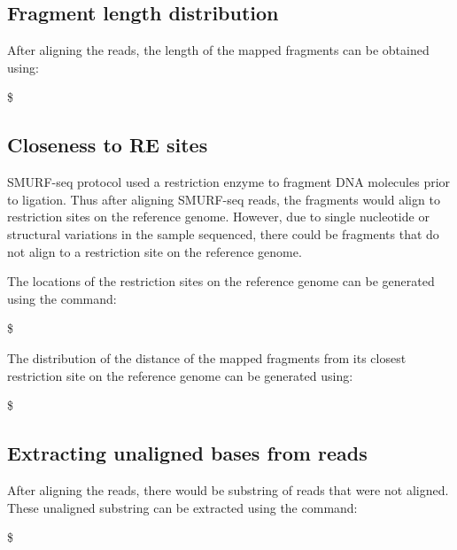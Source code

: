 \documentclass[11pt]{article}
\newenvironment{cmd}
{\list{}{
    \parsep=0em
    \itemindent=17pt
    \listparindent=50pt
    \leftmargin=0in
    \rightmargin=0in
  }\item[] \ttfamily \$}
{\endlist}
\begin{document}
\subsection{Fragment length distribution}
After aligning the reads, the length of the mapped fragments can be obtained
using: 
\begin{cmd}

\end{cmd}

\subsection{Closeness to RE sites}
SMURF-seq protocol used a restriction enzyme to fragment DNA molecules prior 
to ligation. Thus after aligning SMURF-seq reads, the fragments would
align to restriction sites on the reference genome. However, due to single
nucleotide or structural variations in the sample sequenced, there could
be fragments that do not align to a restriction site on the reference
genome. 

The locations of the restriction sites on the reference genome can be 
generated using the command:
\begin{cmd}

\end{cmd}
The distribution of the distance of the mapped fragments from its closest
restriction site on the reference genome can be generated using:
\begin{cmd}

\end{cmd}


\subsection{Extracting unaligned bases from reads}
After aligning the reads, there would be substring of reads that
were not aligned. These unaligned substring can be extracted using
the command:
\begin{cmd}

\end{cmd}



\newpage


\end{document}
